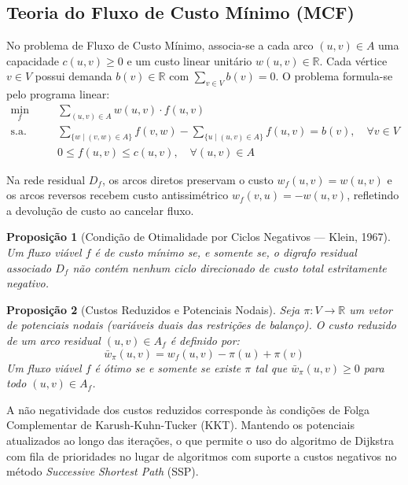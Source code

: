 \documentclass[12pt,a4paper]{article}
\newtheorem{prop}{Proposição}
\newcommand{\sa}{\text{s.a.}\quad}
\begin{document}
\subsection{Teoria do Fluxo de Custo Mínimo (MCF)}

No problema de Fluxo de Custo Mínimo, associa-se a cada arco $(u, v) \in A$ uma capacidade $c(u, v) \ge 0$ e um custo linear unitário $w(u, v) \in \mathbb{R}$. Cada vértice $v \in V$ possui demanda $b(v) \in \mathbb{R}$ com $\sum_{v \in V} b(v) = 0$. O problema formula-se pelo programa linear:
\begin{align}
    \min_{f} \quad & \sum_{(u, v) \in A} w(u, v) \cdot f(u, v) \\
    \sa \quad & \sum_{\{w \mid (v, w) \in A\}} f(v, w) - \sum_{\{u \mid (u, v) \in A\}} f(u, v) = b(v), \quad \forall v \in V \\
    & 0 \le f(u, v) \le c(u, v), \quad \forall (u, v) \in A
\end{align}

Na rede residual $D_f$, os arcos diretos preservam o custo $w_f(u, v) = w(u, v)$ e os arcos reversos recebem custo antissimétrico $w_f(v, u) = -w(u, v)$, refletindo a devolução de custo ao cancelar fluxo.

\begin{prop}[Condição de Otimalidade por Ciclos Negativos --- Klein, 1967]\label{prop:klein_rel}
Um fluxo viável $f$ é de custo mínimo se, e somente se, o digrafo residual associado $D_f$ não contém nenhum ciclo direcionado de custo total estritamente negativo.
\end{prop}

\begin{prop}[Custos Reduzidos e Potenciais Nodais]\label{prop:potenciais_rel}
Seja $\pi: V \to \mathbb{R}$ um vetor de potenciais nodais (variáveis duais das restrições de balanço). O custo reduzido de um arco residual $(u, v) \in A_f$ é definido por:
\begin{equation}
    \bar{w}_\pi(u, v) = w_f(u, v) - \pi(u) + \pi(v)
\end{equation}
Um fluxo viável $f$ é ótimo se e somente se existe $\pi$ tal que $\bar{w}_\pi(u, v) \ge 0$ para todo $(u, v) \in A_f$.
\end{prop}

A não negatividade dos custos reduzidos corresponde às condições de Folga Complementar de Karush-Kuhn-Tucker (KKT). Mantendo os potenciais atualizados ao longo das iterações, o que permite o uso do algoritmo de Dijkstra com fila de prioridades no lugar de algoritmos com suporte a custos negativos no método \textit{Successive Shortest Path} (SSP).
\end{document}
